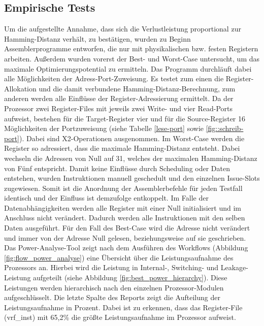 \subsection{Empirische Tests}
\label{cap:empirischeTests}
Um die aufgestellte Annahme, dass sich die Verlustleistung proportional zur Hamming-Distanz verhält, zu bestätigen, wurden zu Beginn Assemblerprogramme entworfen, die nur mit physikalischen bzw. festen Registern arbeiten.
Außerdem wurden vorerst der Best- und Worst-Case untersucht, um das maximale Optimierungspotential zu ermitteln. Das Programm durchläuft dabei alle Möglichkeiten der Adress-Port-Zuweisung. Es testet zum einen die Register-Allokation und die damit verbundene Hamming-Distanz-Berechnung, zum anderen werden alle Einflüsse der Register-Adressierung ermittelt. Da der Prozessor zwei Register-Files mit jeweils zwei Write- und vier Read-Ports aufweist, bestehen für die Target-Register vier und für die Source-Register 16 Möglichkeiten der Portzuweisung (siehe Tabelle \ref{lese-port} sowie \ref{fig::schreib-port}). Dabei sind X2-Operationen ausgenommen. Im Worst-Case werden die Register so adressiert, dass die maximale Hamming-Distanz entsteht. Dabei wechseln die Adressen von Null auf 31, welches der maximalen Hamming-Distanz von Fünf entspricht. Damit keine Einflüsse durch Scheduling oder Daten entstehen, wurden Instruktionen manuell geschedult und den einzelnen Issue-Slots zugewiesen. Somit ist die Anordnung der Assemblerbefehle für jeden Testfall identisch und der Einfluss ist demzufolge entkoppelt. Im Falle der Datenabhängigkeiten werden alle Register mit einer Null initialisiert und im Anschluss nicht verändert. Dadurch werden alle Instruktionen mit den selben Daten ausgeführt.
Für den Fall des Best-Case wird die Adresse nicht verändert und immer von der Adresse Null gelesen, beziehungsweise auf sie geschrieben.
Das Power-Analyse-Tool zeigt nach dem Ausführen des Workflows (Abbildung \ref{fig:flow_power_analyse}) eine Übersicht über die Leistungsaufnahme des Prozessors an. Hierbei wird die Leistung in Internal-, Switching- und Leakage-Leistung aufgeteilt (siehe Abbildung \ref{fig:best_power_hierarchy}).
Diese Leistungen werden hierarchisch nach den einzelnen Prozessor-Modulen aufgeschlüsselt. Die letzte Spalte des Reports zeigt die Aufteilung der Leistungsaufnahme in Prozent. Dabei ist zu erkennen, dass das Register-File (vrf\_inst) mit 65,2\% die größte Leistungsaufnahme im Prozessor aufweist.

